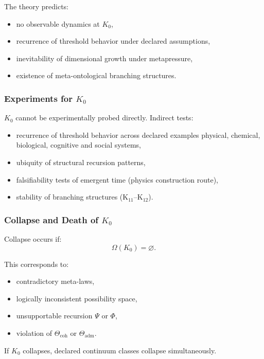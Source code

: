 The theory predicts:
\begin{itemize}
    \item no observable dynamics at $K_0$,
    \item recurrence of threshold behavior under declared assumptions,
    \item inevitability of dimensional growth under metapressure,
    \item existence of meta-ontological branching structures.
\end{itemize}

\subsubsection{Experiments for \texorpdfstring{$K_0$}{K_0}}

$K_0$ cannot be experimentally probed directly.  
Indirect tests:
\begin{itemize}
    \item recurrence of threshold behavior across declared examples physical,
          chemical, biological, cognitive and social systems,
    \item ubiquity of structural recursion patterns,
    \item falsifiability tests of emergent time (physics construction route),
    \item stability of branching structures (K$_{11}$–K$_{12}$).
\end{itemize}

\subsubsection{Collapse and Death of \texorpdfstring{$K_0$}{K_0}}

Collapse occurs if:
\[
\Omega(K_0) = \varnothing.
\]

This corresponds to:
\begin{itemize}
    \item contradictory meta-laws,
    \item logically inconsistent possibility space,
    \item unsupportable recursion $\Psi$ or $\Phi$,
    \item violation of $\Theta_{\mathrm{coh}}$ or $\Theta_{\mathrm{adm}}$.
\end{itemize}

If $K_0$ collapses, declared continuum classes collapse simultaneously.


